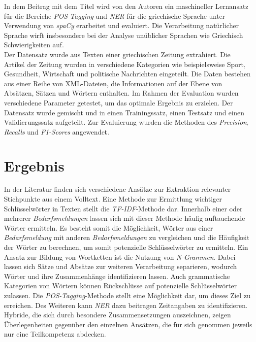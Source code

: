 In dem Beitrag mit dem Titel \cite{partalidou2019design} wird von den Autoren \citeauthor{partalidou2019design} ein maschineller Lernansatz für die Bereiche \emph{POS-Tagging} und \emph{NER} für die griechische Sprache unter Verwendung von \emph{spaCy} erarbeitet und evaluiert. Die Verarbeitung natürlicher Sprache wirft insbesondere bei der Analyse unüblicher Sprachen wie Griechisch Schwierigkeiten auf.\\ Der Datensatz wurde aus Texten einer griechischen Zeitung extrahiert. Die Artikel der Zeitung wurden in verschiedene Kategorien wie beispielsweise Sport, Gesundheit, Wirtschaft und politische Nachrichten eingeteilt. Die Daten bestehen aus einer Reihe von XML-Dateien, die Informationen auf der Ebene von Absätzen, Sätzen und Wörtern enthalten. Im Rahmen der Evaluation wurden verschiedene Parameter getestet, um das optimale Ergebnis zu erzielen. Der Datensatz wurde gemischt und in einen Trainingssatz, einen Testsatz und einen Validierungssatz aufgeteilt. Zur Evaluierung wurden die Methoden des \emph{Precision}, \emph{Recalls} und \emph{F1-Scores} angewendet.

\section{Ergebnis}
In der Literatur finden sich verschiedene Ansätze zur Extraktion relevanter Stichpunkte aus einem Volltext. Eine Methode zur Ermittlung wichtiger Schlüsselwörter in Texten stellt die \emph{TF-IDF}-Methode dar. Innerhalb einer oder mehrerer \emph{Bedarfsmeldungen} lassen sich mit dieser Methode häufig auftauchende Wörter ermitteln. Es besteht somit die Möglichkeit, Wörter aus einer \emph{Bedarfsmeldung} mit anderen \emph{Bedarfsmeldungen} zu vergleichen und die Häufigkeit der Wörter zu berechnen, um somit potenzielle Schlüsselwörter zu ermitteln. %
Ein Ansatz zur Bildung von Wortketten ist die Nutzung von \emph{N-Grammen}. Dabei lassen sich Sätze und Absätze zur weiteren Verarbeitung separieren, wodurch Wörter und ihre Zusammenhänge identifizieren lassen. Auch grammatische Kategorien von Wörtern können Rückschlüsse auf potenzielle Schlüsselwörter zulassen. Die \emph{POS-Tagging}-Methode stellt eine Möglichkeit dar, um dieses Ziel zu erreichen. Des Weiteren kann \emph{NER} dazu beitragen Zeitangaben zu identifizieren. Hybride, die sich durch besondere Zusammensetzungen auszeichnen, zeigen Überlegenheiten gegenüber den einzelnen Ansätzen, die für sich genommen jeweils nur eine Teilkompetenz abdecken.


